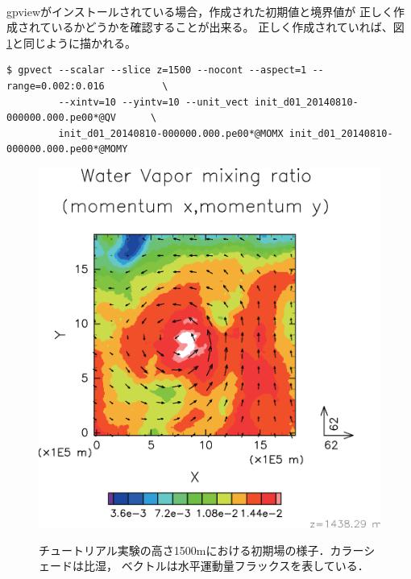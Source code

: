 \vspace{1cm}
 \hrulefill \\
gpviewがインストールされている場合，作成された初期値と境界値が
正しく作成されているかどうかを確認することが出来る。
正しく作成されていれば、図 \ref{fig:init}と同じように描かれる。

\begin{verbatim}
$ gpvect --scalar --slice z=1500 --nocont --aspect=1 --range=0.002:0.016          \
         --xintv=10 --yintv=10 --unit_vect init_d01_20140810-000000.000.pe00*@QV      \
         init_d01_20140810-000000.000.pe00*@MOMX init_d01_20140810-000000.000.pe00*@MOMY
\end{verbatim}


\begin{figure}[h]
\begin{center}
  \includegraphics[width=0.7\hsize]{./figure/init_qv-momxy.eps}\\
  \caption{チュートリアル実験の高さ1500mにおける初期場の様子．カラーシェードは比湿，
           ベクトルは水平運動量フラックスを表している．}
  \label{fig:init}
\end{center}
\end{figure}

